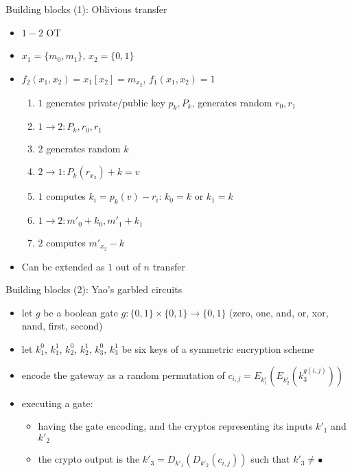 \documentclass{beamer}
\begin{document}
\begin{frame}{Building blocks (1): Oblivious transfer}
  \begin{itemize}
    \item $1-2$ OT
    \item $x_1 = \{m_0, m_1\}$, $x_2 = \{0, 1\}$
    \item $f_2(x_1, x_2) = x_1[x_2] = m_{x_2}$, $f_1(x_1, x_2) = 1$
      
      \begin{enumerate}
        \item $1$ generates private/public key $p_k, P_k$, generates random $r_0, r_1$
        \item $1 \rightarrow 2: P_k,r_0,r_1$
        \item $2$ generates random $k$
        \item $2 \rightarrow 1: P_k(r_{x_2}) + k = v$
        \item $1$ computes $k_i = p_k(v)-r_i$: $k_0=k$ or $k_1=k$
        \item $1 \rightarrow 2: m'_0+k_0, m'_1+k_1$
        \item $2$ computes $m'_{x_2} - k$
      \end{enumerate}
    \item Can be extended as $1$ out of $n$ transfer
  \end{itemize}
\end{frame}


\begin{frame}{Building blocks (2): Yao's garbled circuits}
  
  \begin{itemize}
  \item let $g$ be a boolean gate $g:\{0,1\} \times \{0,1\}
    \rightarrow \{0,1\}$ (zero, one, and, or, xor, nand, first, second)
  \item let $k^0_1$, $k^1_1$, $k^0_2$, $k^1_2$, $k^0_3$, $k^1_3$ be
    six keys of a symmetric encryption scheme
  \item encode the gateway as a random permutation of
    $c_{i,j} = E_{k^i_1}(E_{k^i_2}(k^{g(i,j)}_3))$
  \item executing a gate:
    
    \begin{itemize}
    \item having the gate encoding, and the cryptos representing its
      inputs $k'_1$ and $k'_2$
    \item the crypto output is the $k'_3=D_{k'_1}(D_{k'_2}(c_{i,j}))$
      such that $k'_3 \neq \bullet$
    \end{itemize}
  \end{itemize}
\end{frame}
\end{document}
